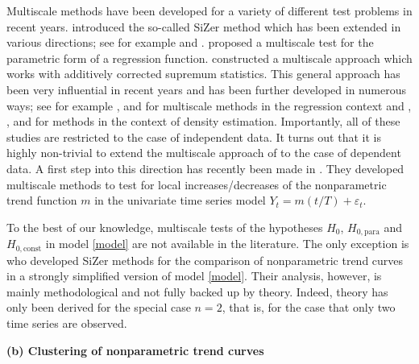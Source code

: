 Multiscale methods have been developed for a variety of different test problems in recent years. \cite{ChaudhuriMarron1999, ChaudhuriMarron2000} introduced the so-called SiZer method which has been extended in various directions; see for example \cite{HannigMarron2006} and \cite{Rondonotti2007}. \cite{HorowitzSpokoiny2001} proposed a multiscale test for the parametric form of a regression function. \cite{DuembgenSpokoiny2001} constructed a multiscale approach which works with additively corrected supremum statistics. This general approach has been very influential in recent years and has been further developed in numerous ways; see for example \cite{Duembgen2002}, \cite{Rohde2008} and \cite{ProkschWernerMunk2018} for multiscale methods in the regression context and \cite{DuembgenWalther2008}, \cite{RufibachWalther2010}, \cite{SchmidtHieber2013} and \cite{EckleBissantzDette2017} for methods in the context of density estimation. Importantly, all of these studies are restricted to the case of independent data. It turns out that it is highly non-trivial to extend the multiscale approach of \cite{DuembgenSpokoiny2001} to the case of dependent data. A first step into this direction has recently been made in \cite{KhismatullinaVogt2018}. They developed multiscale methods to test for local increases/decreases of the nonparametric trend function $m$ in the univariate time series model $Y_t = m(t/T) + \varepsilon_t$.  


To the best of our knowledge, multiscale tests of the hypotheses $H_0$, $H_{0,\text{para}}$ and $H_{0,\text{const}}$ in model \eqref{model} are not available in the literature. The only exception is \cite{Park2009} who developed SiZer methods for the comparison of nonparametric trend curves in a strongly simplified version of model \eqref{model}. Their analysis, however, is mainly methodological and not fully backed up by theory. Indeed, theory has only been derived for the special case $n=2$, that is, for the case that only two time series are observed. 
\vspace{10pt}


\noindent \textbf{(b) Clustering of nonparametric trend curves} 
\vspace{10pt} 


